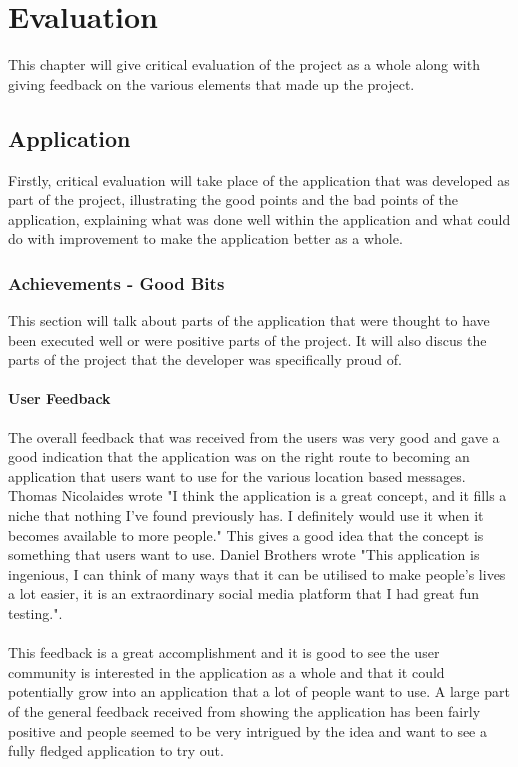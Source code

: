 \chapter{Evaluation}

This chapter will give critical evaluation of the project as a whole along with giving feedback on the various elements that made up the project.

\section{Application}

Firstly, critical evaluation will take place of the application that was developed as part of the project, illustrating the good points and the bad points of the application, explaining what was done well within the application and what could do with improvement to make the application better as a whole.

\subsection{Achievements - Good Bits}

This section will talk about parts of the application that were thought to have been executed well or were positive parts of the project. It will also discus the parts of the project that the developer was specifically proud of.

\subsubsection{User Feedback}

The overall feedback that was received from the users was very good and gave a good indication that the application was on the right route to becoming an application that users want to use for the various location based messages. Thomas Nicolaides wrote "I think the application is a great concept, and it fills a niche that nothing I've found previously has. I definitely would use it when it becomes available to more people." This gives a good idea that the concept is something that users want to use. Daniel Brothers wrote "This application is ingenious, I can think of many ways that it can be utilised to make people's lives a lot easier, it is an extraordinary social media platform that I had great fun testing.".\\
\\
This feedback is a great accomplishment and it is good to see the user community is interested in the application as a whole and that it could potentially grow into an application that a lot of people want to use. A large part of the general feedback received from showing the application has been fairly positive and people seemed to be very intrigued by the idea and want to see a fully fledged application to try out.

